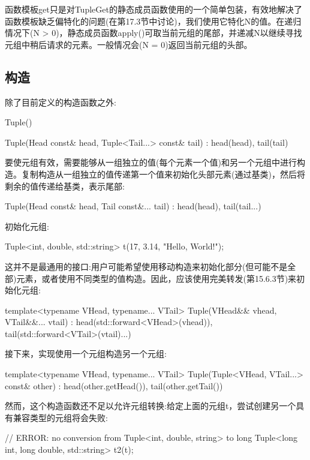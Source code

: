 函数模板get只是对TupleGet的静态成员函数使用的一个简单包装，有效地解决了函数模板缺乏偏特化的问题(在第17.3节中讨论)，我们使用它特化N的值。在递归情况下(N > 0)，静态成员函数apply()可取当前元组的尾部，并递减N以继续寻找元组中稍后请求的元素。一般情况会(N = 0)返回当前元组的头部。

\subsection{构造}

除了目前定义的构造函数之外:

\begin{cpp}
Tuple() {
}

Tuple(Head const& head, Tuple<Tail...> const& tail)
: head(head), tail(tail) {
}
\end{cpp}

要使元组有效，需要能够从一组独立的值(每个元素一个值)和另一个元组中进行构造。复制构造从一组独立的值传递第一个值来初始化头部元素(通过基类)，然后将剩余的值传递给基类，表示尾部:

\begin{cpp}
Tuple(Head const& head, Tail const&... tail)
: head(head), tail(tail...) {
}
\end{cpp}

初始化元组:

\begin{cpp}
Tuple<int, double, std::string> t(17, 3.14, "Hello, World!");
\end{cpp}

这并不是最通用的接口:用户可能希望使用移动构造来初始化部分(但可能不是全部)元素，或者使用不同类型的值构造。因此，应该使用完美转发(第15.6.3节)来初始化元组:

\begin{cpp}
template<typename VHead, typename... VTail>
Tuple(VHead&& vhead, VTail&&... vtail)
	: head(std::forward<VHead>(vhead)),
		tail(std::forward<VTail>(vtail)...) {
}
\end{cpp}

接下来，实现使用一个元组构造另一个元组:

\begin{cpp}
template<typename VHead, typename... VTail>
Tuple(Tuple<VHead, VTail...> const& other)
: head(other.getHead()), tail(other.getTail()) { }
\end{cpp}

然而，这个构造函数还不足以允许元组转换:给定上面的元组t，尝试创建另一个具有兼容类型的元组将会失败:

\begin{cpp}
// ERROR: no conversion from Tuple<int, double, string> to long
Tuple<long int, long double, std::string> t2(t);
\end{cpp}

